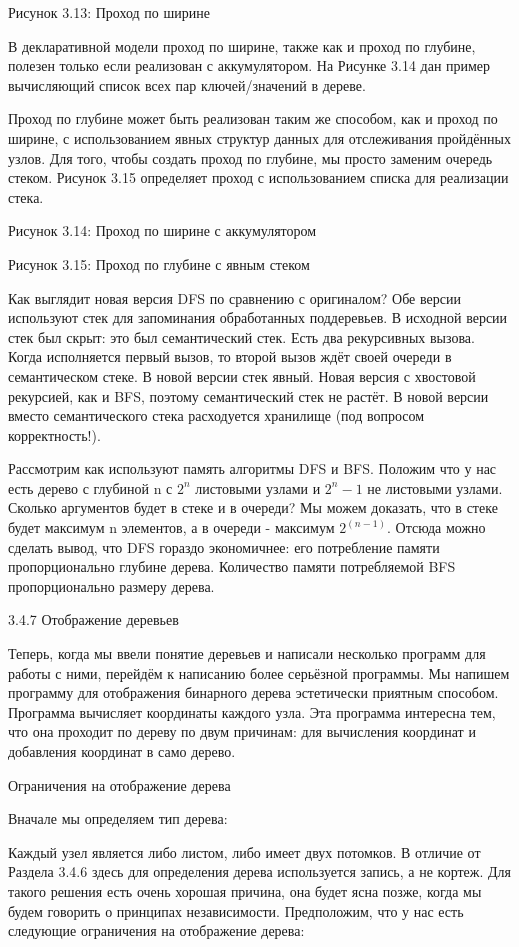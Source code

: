 Рисунок 3.13: Проход по ширине

В декларативной модели проход по ширине, также как и проход по глубине, полезен только если реализован с аккумулятором. На Рисунке 3.14 дан пример вычисляющий список всех пар ключей/значений в дереве.

Проход по глубине может быть реализован таким же способом, как и проход по ширине, с использованием явных структур данных для отслеживания пройдённых узлов. Для того, чтобы создать проход по глубине, мы просто заменим очередь стеком. Рисунок 3.15 определяет проход с использованием списка для реализации стека.

Рисунок 3.14: Проход по ширине с аккумулятором

Рисунок 3.15: Проход по глубине с явным стеком

Как выглядит новая версия DFS по сравнению с оригиналом? Обе версии используют стек для запоминания обработанных поддеревьев. В исходной версии стек был скрыт: это был семантический стек. Есть два рекурсивных вызова. Когда исполняется первый вызов, то второй вызов ждёт своей очереди в семантическом стеке. В новой версии стек явный. Новая версия с хвостовой рекурсией, как и BFS, поэтому семантический стек не растёт. В новой версии вместо семантического стека расходуется хранилище (под вопросом корректность!).

Рассмотрим как используют память алгоритмы DFS и BFS. Положим что у нас есть дерево с глубиной n с $2^n$ листовыми узлами и $2^n-1$ не листовыми узлами. Сколько аргументов будет в стеке и в очереди? Мы можем доказать, что в стеке будет максимум n элементов, а в очереди - максимум $2^(n-1)$. Отсюда можно сделать вывод, что DFS гораздо экономичнее: его потребление памяти пропорционально глубине дерева. Количество памяти потребляемой BFS пропорционально размеру дерева.

3.4.7 Отображение деревьев

Теперь, когда мы ввели понятие деревьев и написали несколько программ для работы с ними, перейдём к написанию более серьёзной программы. Мы напишем программу для отображения бинарного дерева эстетически приятным способом. Программа вычисляет координаты каждого узла. Эта программа интересна тем, что она проходит по дереву по двум причинам: для вычисления координат и добавления координат в само дерево.

Ограничения на отображение дерева

Вначале мы определяем тип дерева:

Каждый узел является либо листом, либо имеет двух потомков. В отличие от Раздела 3.4.6 здесь для определения дерева используется запись, а не кортеж. Для такого решения есть очень хорошая причина, она будет ясна позже, когда мы будем говорить о принципах независимости. Предположим, что у нас есть следующие ограничения на отображение дерева:

